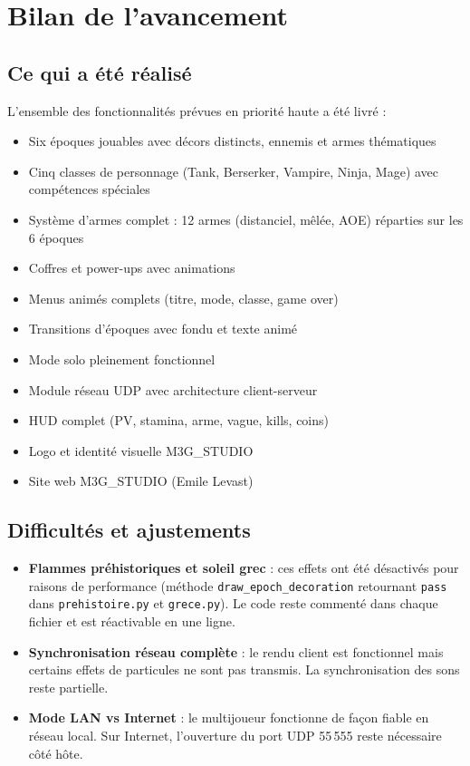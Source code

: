\documentclass[12pt,a4paper]{article}
\newcommand{\okitem}{\textcolor{okgreen}{$\checkmark$}}
\begin{document}
\section{Bilan de l'avancement}

\subsection{Ce qui a été réalisé}

L'ensemble des fonctionnalités prévues en priorité haute a été livré :

\begin{itemize}[leftmargin=1.8em, itemsep=2pt]
  \item[\okitem] Six époques jouables avec décors distincts, ennemis et armes thématiques
  \item[\okitem] Cinq classes de personnage (Tank, Berserker, Vampire, Ninja, Mage) avec compétences spéciales
  \item[\okitem] Système d'armes complet : 12 armes (distanciel, mêlée, AOE) réparties sur les 6 époques
  \item[\okitem] Coffres et power-ups avec animations
  \item[\okitem] Menus animés complets (titre, mode, classe, game over)
  \item[\okitem] Transitions d'époques avec fondu et texte animé
  \item[\okitem] Mode solo pleinement fonctionnel
  \item[\okitem] Module réseau UDP avec architecture client-serveur
  \item[\okitem] HUD complet (PV, stamina, arme, vague, kills, coins)
  \item[\okitem] Logo et identité visuelle M3G\_STUDIO
  \item[\okitem] Site web M3G\_STUDIO (Emile Levast)
\end{itemize}

\subsection{Difficultés et ajustements}

\begin{itemize}[leftmargin=1.5em, itemsep=4pt]
  \item \textbf{Flammes préhistoriques et soleil grec} : ces effets ont été désactivés pour raisons de performance (méthode \texttt{draw\_epoch\_decoration} retournant \texttt{pass} dans \texttt{prehistoire.py} et \texttt{grece.py}). Le code reste commenté dans chaque fichier et est réactivable en une ligne.
  \item \textbf{Synchronisation réseau complète} : le rendu client est fonctionnel mais certains effets de particules ne sont pas transmis. La synchronisation des sons reste partielle.
  \item \textbf{Mode LAN vs Internet} : le multijoueur fonctionne de façon fiable en réseau local. Sur Internet, l'ouverture du port UDP 55\,555 reste nécessaire côté hôte.
\end{itemize}
\end{document}
